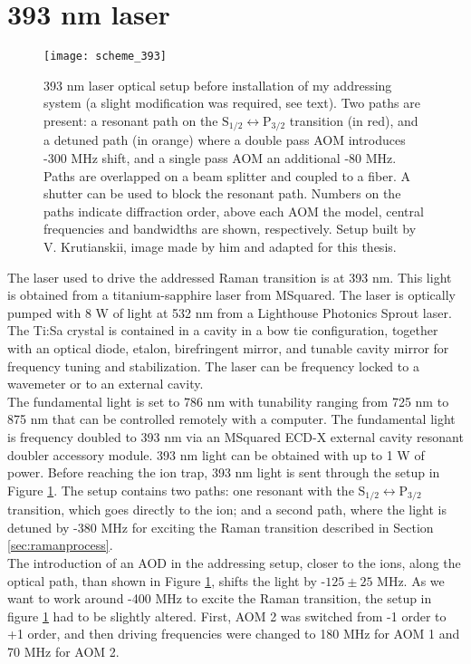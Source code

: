 \section{393 nm laser}
\label{sec:393setup}
\begin{figure}[!ht]
\centering
\texttt{[image: scheme\_393]}
\caption{393 nm laser optical setup before installation of my addressing system (a slight modification was required, see text). Two paths are present: a resonant path on the $\text{S}_{1/2} \leftrightarrow \text{P}_{3/2}$ transition (in red), and a detuned path (in orange) where a double pass AOM introduces -300 MHz shift, and a single pass AOM an additional -80 MHz. Paths are overlapped on a beam splitter and coupled to a fiber. A shutter can be used to block the resonant path. Numbers on the paths indicate diffraction order, above each AOM the model, central frequencies and bandwidths are shown, respectively. Setup built by V. Krutianskii, image made by him and adapted for this thesis.
}
\label{scheme393}
\end{figure}
The laser used to drive the addressed Raman transition is at 393 nm. This light is obtained from a titanium-sapphire laser from MSquared. The laser is optically pumped with 8 W of light at 532 nm from a Lighthouse Photonics Sprout laser. The Ti:Sa crystal is contained in a cavity in a bow tie configuration, together with an optical diode, etalon, birefringent mirror, and tunable cavity mirror for frequency tuning and stabilization. The laser can be frequency locked to a wavemeter or to an external cavity.\\ The fundamental light is set to 786 nm with tunability ranging from 725 nm to 875 nm that can be controlled remotely with a computer. The fundamental light is frequency doubled to 393 nm via an MSquared ECD-X external cavity resonant doubler accessory module. 393 nm light can be obtained with up to 1 W of power. Before reaching the ion trap, 393 nm light is sent through the setup in Figure \ref{scheme393}. The setup contains two paths: one resonant with the $\text{S}_{1/2} \leftrightarrow \text{P}_{3/2}$ transition, which goes directly to the ion; and a second path, where the light is detuned by -380 MHz for exciting the Raman transition described in Section \ref{sec:ramanprocess}.\\
The introduction of an AOD in the addressing setup, closer to the ions, along the optical path, than shown in Figure \ref{scheme393}, shifts the light by -$125\pm25$ MHz. As we want to work around -400 MHz to excite the Raman transition, the setup in figure \ref{scheme393} had to be slightly altered. First, AOM 2 was switched from -1 order to +1 order, and then driving frequencies were changed to 180 MHz for AOM 1 and 70 MHz for AOM 2.

